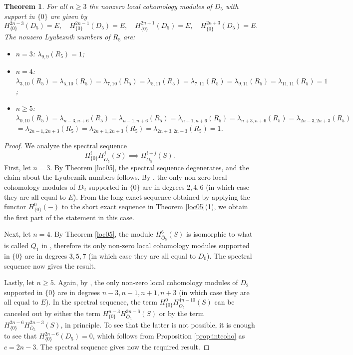 \documentclass[11pt,reqno]{amsart}
\newcommand{\ol}[1]{\overline{#1}}
\newtheorem{theorem}{Theorem}[section]
\numberwithin{equation}{section}
\begin{document}
\begin{theorem}
For all $n\geq 3$ the nonzero local cohomology modules of $D_5$ with support in $\{0\}$ are given by	
$$
H^{2n-3}_{\{0\}}(D_5)=E,\quad H^{2n-1}_{\{0\}}(D_5)=E,\quad H^{2n+1}_{\{0\}}(D_5)=E,\quad H^{2n+3}_{\{0\}}(D_5)=E.
$$
The nonzero Lyubeznik numbers of $R_5$ are:
\begin{itemize}
\item[(a)] $n=3$: $\lambda_{9,9}(R_5)=1$; 
\item[(b)] $n=4$: $\lambda_{3,10}(R_5) = \lambda_{5,10}(R_5) = \lambda_{7,10}(R_5)= \lambda_{5,11}(R_5)=\lambda_{7,11}(R_5)= \lambda_{9,11}(R_5)= \lambda_{11,11}(R_5)=1$;
\item[(c)] $n\geq 5$: $\lambda_{0,10}(R_5) = \lambda_{n-3,n+6}(R_5) = \lambda_{n-1,n+6}(R_5)= \lambda_{n+1,n+6}(R_5)=\lambda_{n+3,n+6}(R_5)= \lambda_{2n-3,2n+3}(R_5)$ $= \lambda_{2n-1,2n+3}(R_5)=\lambda_{2n+1,2n+3}(R_5)=\lambda_{2n+3,2n+3}(R_5)=1$.
\end{itemize}
\end{theorem}


\begin{proof}
We analyze the spectral sequence 
\[H^i_{\{0\}} H^j_{\ol{O}_5} (S) \implies H^{i+j}_{\ol{O}_5}(S).\]
First, let $n=3$. By Theorem \ref{loc05}, the spectral sequence degenerates, and the claim about the Lyubeznik numbers follows. By \cite[Theorem 1.1]{lorcla}, the only non-zero local cohomology modules of $D_2$ supported in $\{0\}$ are in degrees $2, 4, 6$ (in which case they are all equal to $E$). From the long exact sequence obtained by applying the functor $H_{\{0\}}^0(-)$ to the short exact sequence in Theorem \ref{loc05}(1), we obtain the first part of the statement in this case.


Next, let $n=4$. By Theorem \ref{loc05}, the module $H^6_{\ol{O}_5}(S)$ is isomorphic to what is called $Q_1$ in \cite[Theorem 1.6]{lorcla}, therefore its only non-zero local cohomology modules supported in $\{0\}$ are in degrees $3, 5, 7$ (in which case they are all equal to $D_0$). The spectral sequence now gives the result.

Lastly, let $n\geq 5$. Again, by \cite[Theorem 1.1]{lorcla}, the only non-zero local cohomology modules of $D_2$ supported in $\{0\}$ are in degrees $n-3, n-1, n+1, n+3$ (in which case they are all equal to $E$). In the spectral sequence, the term $H^0_{\{0\}} H^{4n-10}_{\ol{O}_5}(S)$ can be canceled out by either the term $H^{n-3}_{\{0\}} H^{3n-6}_{\ol{O}_5}(S)$ or by the term $H^{2n-6}_{\{0\}} H^{2n-3}_{\ol{O}_5}(S)$, in principle. To see that the latter is not possible, it is enough to see that  $H^{2n-6}_{\{0\}}(D_5) = 0$, which follows from Proposition \ref{prop:intcoho} as $c= 2n-3$. The spectral sequence gives now the required result.
\end{proof}
\end{document}
